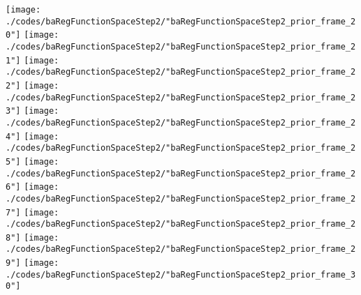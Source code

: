 \begin{frame}{\insertsection}
\begin{center}
{\begin{animateinline}{15}
				 \texttt{[image: ./codes/baRegFunctionSpaceStep2/"baRegFunctionSpaceStep2\_prior\_frame\_20"]}\newframe
				 \texttt{[image: ./codes/baRegFunctionSpaceStep2/"baRegFunctionSpaceStep2\_prior\_frame\_21"]}\newframe
				 \texttt{[image: ./codes/baRegFunctionSpaceStep2/"baRegFunctionSpaceStep2\_prior\_frame\_22"]}\newframe
				 \texttt{[image: ./codes/baRegFunctionSpaceStep2/"baRegFunctionSpaceStep2\_prior\_frame\_23"]}\newframe
				 \texttt{[image: ./codes/baRegFunctionSpaceStep2/"baRegFunctionSpaceStep2\_prior\_frame\_24"]}\newframe
				 \texttt{[image: ./codes/baRegFunctionSpaceStep2/"baRegFunctionSpaceStep2\_prior\_frame\_25"]}\newframe
				 \texttt{[image: ./codes/baRegFunctionSpaceStep2/"baRegFunctionSpaceStep2\_prior\_frame\_26"]}\newframe
				 \texttt{[image: ./codes/baRegFunctionSpaceStep2/"baRegFunctionSpaceStep2\_prior\_frame\_27"]}\newframe
				 \texttt{[image: ./codes/baRegFunctionSpaceStep2/"baRegFunctionSpaceStep2\_prior\_frame\_28"]}\newframe
				 \texttt{[image: ./codes/baRegFunctionSpaceStep2/"baRegFunctionSpaceStep2\_prior\_frame\_29"]}\newframe
				 \texttt{[image: ./codes/baRegFunctionSpaceStep2/"baRegFunctionSpaceStep2\_prior\_frame\_30"]}
			 \end{animateinline}
			}
	\end{center}
    
\end{frame}


